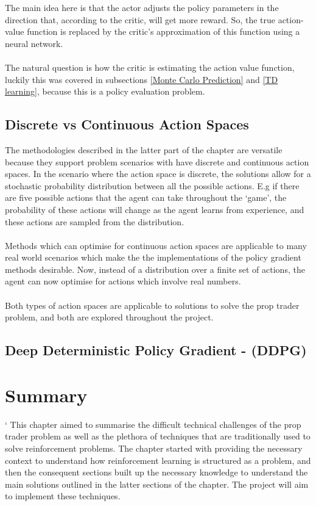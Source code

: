 \documentclass[ %
                    author={Ashwinder Khurana},
                supervisor={Prof Dave Cliff},
                    degree={MEng},
                     title={The Deeply Reinforced Trader},
                  subtitle={},
                      type={enterprise},
                      year={2020} ]{dissertation}
\begin{document}
{\noindent
The main idea here is that the actor adjusts the policy parameters in the direction that, according to the critic, will get more reward. So, the true action-value function is replaced by the critic's approximation of this function using a neural network. 
\\
\\
\noindent
The natural question is how the critic is estimating the action value function, luckily this was covered in subsections \ref{Monte Carlo Prediction} and \ref{TD learning}, because this is a policy evaluation problem. 

%
\subsection{Discrete vs Continuous Action Spaces}
\label{subsection:Discrete Vs Continuous Action Spaces}
The methodologies described in the latter part of the chapter are versatile because they support problem scenarios with have discrete and continuous action spaces. In the scenario where the action space is discrete, the solutions allow for a stochastic probability distribution between all the possible actions. E.g if there are five possible actions that the agent can take throughout the \enquote*{game}, the probability of these actions will change as the agent learns from experience, and these actions are sampled from the distribution. 
\\
\\
Methods which can optimise for continuous action spaces are applicable to many real world scenarios which make the the implementations of the policy gradient methods desirable. Now, instead of a distribution over a finite set of actions, the agent can now optimise for actions which involve real numbers.
\\
\\
\noindent
Both types of action spaces are applicable to solutions to solve the prop trader problem, and both are explored throughout the project.
\subsection{Deep Deterministic Policy Gradient - (DDPG)}
\label{subsection:Deep Deterministic Policy Gradient}
\section{Summary}`
\noindent
This chapter aimed to summarise the difficult technical challenges of the prop trader problem as well as the plethora of techniques that are traditionally used to solve reinforcement problems. The chapter started with providing the necessary context to understand how reinforcement learning is structured as a problem, and then the consequent sections built up the necessary knowledge to understand the main solutions outlined in the latter sections of the chapter. The project will aim to implement these techniques. 

}
\end{document}
